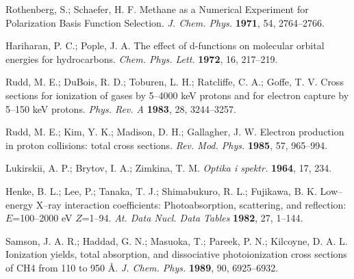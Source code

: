 \documentclass[10pt]{article}
\begin{document}
\begin{thebibliography}{10}
Rothenberg, S.; Schaefer, H. F.
Methane as a Numerical Experiment for Polarization Basis Function Selection.
{\it J. Chem. Phys.} {\bf 1971}, 54, 2764--2766.

Hariharan, P. C.; Pople, J. A.
The effect of d-functions on molecular orbital energies for hydrocarbons.
{\it Chem. Phys. Lett.} {\bf 1972}, 16, 217--219.

Rudd, M. E.; DuBois, R. D.; Toburen, L. H.; Ratcliffe, C. A.; Goffe, T. V.
Cross sections for ionization of gases by 5--4000 keV protons and for electron capture by 5--150 keV protons.
{\it Phys. Rev. A} {\bf 1983}, 28, 3244--3257.

Rudd, M. E.; Kim, Y. K.; Madison, D. H.; Gallagher, J. W.
Electron production in proton collisions: total cross sections.
{\it Rev. Mod. Phys.} {\bf 1985}, 57, 965--994.

Lukirskii, A. P.; Brytov, I. A.; Zimkina, T. M.
{\it Optika i spektr.} {\bf 1964}, 17, 234.

Henke, B. L.; Lee, P.; Tanaka, T. J.; Shimabukuro, R. L.; Fujikawa, B. K.
Low--energy X--ray interaction coefficients: Photoabsorption, scattering, and reflection: $E$=100--2000 eV $Z$=1--94.
{\it At. Data Nucl. Data Tables} {\bf 1982}, 27, 1--144.

Samson, J. A. R.; Haddad, G. N.; Masuoka, T.; Pareek, P. N.; Kilcoyne, D. A. L.
Ionization yields, total absorption, and dissociative photoionization cross sections of CH4 from 110 to 950 \AA.
{\it J. Chem. Phys.} {\bf 1989}, 90, 6925--6932.

\end{thebibliography}
\end{document}
